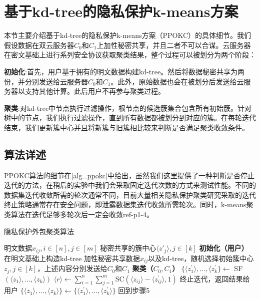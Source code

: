 \section{基于kd-tree的隐私保护k-means方案}
\label{s3-ppokc}
本节主要介绍基于kd-tree的隐私保护k-means方案（PPOKC）的具体细节。我们假设数据在双云服务器$C_0$和$C_1$上加性秘密共享，并且二者不可以合谋。云服务器在密文基础上进行系列安全协议获取聚类结果，整个过程可以被划分为两个阶段：
\begin{compactitem}
    \item \textbf{初始化}:首先，用户基于拥有的明文数据构建kd-tree。然后将数据秘密共享为两份，并分别发送给云服务器$C_0$和$C_1$。此外，原始数据也会在被划分后发送给云服务器以支持其他计算。此后用户不再参与聚类过程。
    \item \textbf{聚类}:对kd-tree中节点执行过滤操作，根节点的候选簇集合包含所有初始簇。针对树中的节点，我们执行过滤操作，直到所有数据都被划分到对应的簇。在每轮迭代结束，我们更新簇中心并且将新簇与旧簇相比较来判断是否满足聚类收敛条件。
\end{compactitem}

\subsection{算法详述}
PPOKC算法的细节在\ref{alg_ppokc}中给出，虽然我们这里提供了一种判断是否停止迭代的方法，在稍后的实验中我们会采取固定迭代次数的方式来测试性能。不同的数据集迭代收敛所需的轮次通常不同，目前大量相关隐私保护聚类研究采取的迭代终止策略通常存在安全问题，即泄露数据集迭代收敛所需轮次。同时，k-means聚类算法在迭代足够多轮次后一定会收敛ref-p1-4。
\begin{algorithm}[htbp]
    \renewcommand{\algorithmicrequire}{\textbf{输入:}}
    \renewcommand{\algorithmicensure}{\textbf{输出:}}
    \caption{隐私保护外包聚类算法}
    \label{alg_ppokc}
    \begin{algorithmic}[1]
        \REQUIRE 明文数据$x_{ij},i\in[n],j\in[m]$
        \ENSURE 秘密共享的簇中心$\langle z'_j \rangle,j\in[k]$
        \STATE \textbf{初始化（用户）}
        \STATE 在明文基础上构造kd-tree
        \STATE 加性秘密共享数据$x_{ij}$以及kd-tree，随机选择初始簇中心$z_j,j\in[k]$，上述内容分别发送给$C_0$和$C_1$
        \STATE \textbf{聚类（$C_0,C_1$）}
        \STATE $\{\langle z^{\prime}_1 \rangle,...,\langle z^{\prime}_k\} \leftarrow$ SF$(\langle z_1\rangle,...,\langle z_k\rangle)$
        \STATE $\langle r \rangle \leftarrow \sum_{i=1}^{n}\sum_{j=1}^{m}$SC$(\langle z_{ij}\rangle-\langle z_{ij}^{\prime}\rangle, 1)$
        \STATE 终止迭代，返回结果给用户
        \ELSE
        \STATE $\{\langle z_1 \rangle,...,\langle z_k \rangle \} \leftarrow \{\langle z^{\prime}_1 \rangle,...,\langle z^{\prime}_k\rangle\}$
        \STATE 回到步骤5
        \ENDIF
    \end{algorithmic}
\end{algorithm}

